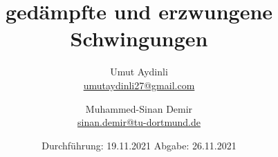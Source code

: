 

\subject{V354}
\title{gedämpfte und erzwungene Schwingungen}
 \author{Umut Aydinli \\
 \href{mailto:umutaydinli27@gmail.com}{umutaydinli27@gmail.com}
 \and Muhammed-Sinan Demir \\
 \href{mailto:sinan.demir@tu-dortmund.de}{sinan.demir@tu-dortmund.de}
}
\date{
  Durchführung: 19.11.2021
  \hspace{3em}
  Abgabe: 26.11.2021
}




\maketitle
\tableofcontents
\newpage






\newpage








\printbibliography{}

